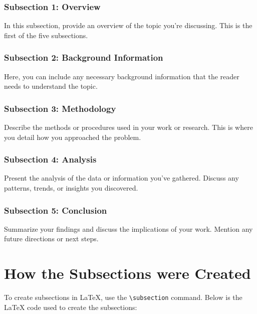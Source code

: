 \documentclass[12pt,a4paper]{article}
\begin{document}
	\subsubsection{Subsection 1: Overview}
	In this subsection, provide an overview of the topic you're discussing. This is the first of the five subsections.
	
	\subsubsection{Subsection 2: Background Information}
	Here, you can include any necessary background information that the reader needs to understand the topic.
	
	\subsubsection{Subsection 3: Methodology}
	Describe the methods or procedures used in your work or research. This is where you detail how you approached the problem.
	
	\subsubsection{Subsection 4: Analysis}
	Present the analysis of the data or information you've gathered. Discuss any patterns, trends, or insights you discovered.
	
	\subsubsection{Subsection 5: Conclusion}
	Summarize your findings and discuss the implications of your work. Mention any future directions or next steps.
 \vspace{0.5cm}
\section{How the Subsections were Created}
To create subsections in LaTeX, use the \texttt{\textbackslash subsection} command. Below is the LaTeX code used to create the subsections:
\end{document}
